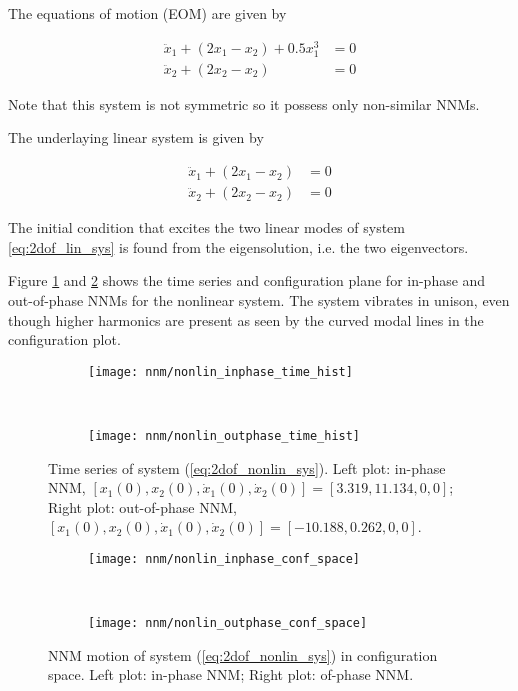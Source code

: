 The equations of motion (EOM) are given by

\begin{equation}
  \label{eq:2dof_nonlin_sys}
  \begin{aligned}
    \ddot x_1 + (2x_1 - x_2) + 0.5 x_1^3 &= 0 \\
    \ddot x_2 + (2x_2 - x_2) &= 0
  \end{aligned}
\end{equation}

Note that this system is not symmetric so it possess only non-similar NNMs.


The underlaying linear system is given by

\begin{equation}
  \label{eq:2dof_lin_sys}
  \begin{aligned}
    \ddot x_1 + (2x_1 - x_2) &= 0 \\
    \ddot x_2 + (2x_2 - x_2) &= 0
  \end{aligned}
\end{equation}

The initial condition that excites the two linear modes of system
\eqref{eq:2dof_lin_sys} is found from the eigensolution, i.e. the two
eigenvectors.


Figure \ref{fig:nonlin_time_series} and \ref{fig:nonlin_nnm_config} shows the
time series and configuration plane for in-phase and out-of-phase NNMs for the
nonlinear system. The system vibrates in unison, even though higher harmonics
are present as seen by the curved modal lines in the configuration plot.


\begin{figure}[!ht]
  \centering
  \begin{subfigure}[b]{0.45\textwidth}
    \texttt{[image: nnm/nonlin\_inphase\_time\_hist]}
  \end{subfigure}
  ~
  \begin{subfigure}[b]{0.45\textwidth}
    \texttt{[image: nnm/nonlin\_outphase\_time\_hist]}
  \end{subfigure}
  \caption{Time series of system (\ref{eq:2dof_nonlin_sys}).
    Left plot: in-phase NNM,
    $[x_1(0), x_2(0), \dot x_1(0), \dot x_2(0)] = [3.319, 11.134,0,0]$;
    Right plot: out-of-phase NNM,
    $[x_1(0), x_2(0), \dot x_1(0), \dot x_2(0)] = [-10.188, 0.262,0,0]$.}
  \label{fig:nonlin_time_series}
\end{figure}

\begin{figure}[!ht]
  \centering
  \begin{subfigure}[b]{0.45\textwidth}
    \texttt{[image: nnm/nonlin\_inphase\_conf\_space]}
  \end{subfigure}
  ~
  \begin{subfigure}[b]{0.45\textwidth}
    \texttt{[image: nnm/nonlin\_outphase\_conf\_space]}
  \end{subfigure}
  \caption{NNM motion of system (\ref{eq:2dof_nonlin_sys}) in configuration space.
    Left plot: in-phase NNM;
    Right plot: of-phase NNM.}
  \label{fig:nonlin_nnm_config}
\end{figure}



